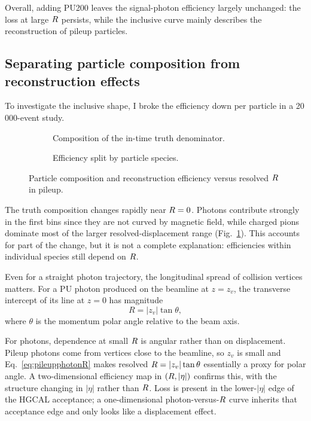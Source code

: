 Overall, adding PU200 leaves the signal-photon efficiency largely unchanged:
the loss at large $R$ persists, while the inclusive curve mainly describes
the reconstruction of pileup particles.

\subsection{Separating particle composition from reconstruction effects}

To investigate the inclusive shape, I broke the efficiency down per particle
in a 20\,000-event study.

\begin{figure}[!tp]
  \centering
  \begin{subfigure}{0.49\textwidth}
    \caption{Composition of the in-time truth denominator.}
  \end{subfigure}\hfill
  \begin{subfigure}{0.49\textwidth}
    \caption{Efficiency split by particle species.}
  \end{subfigure}
  \caption{Particle composition and reconstruction efficiency versus resolved
  $R$ in pileup.}
  \label{fig:pileuppid}
\end{figure}

The truth composition changes rapidly near $R=0$. Photons contribute
strongly in the first bins since they are not curved by magnetic field, while charged pions dominate most of the larger
resolved-displacement range (Fig.~\ref{fig:pileuppid}). This accounts for part
of the change, but it is not a complete explanation: efficiencies
within individual species still depend on $R$.

Even for a straight photon trajectory, the longitudinal spread of collision
vertices matters. For a PU photon produced on the beamline at $z=z_v$, the
transverse intercept of its line at $z=0$ has magnitude
\begin{equation}
 R=|z_v|\tan\theta,
 \label{eq:pileupphotonR}
\end{equation}
where $\theta$ is the momentum polar angle relative to the beam axis.

For photons, dependence at small $R$ is angular rather
than on displacement. Pileup photons come from vertices close to the beamline,
so $z_v$ is small and Eq.~\eqref{eq:pileupphotonR} makes resolved
$R=|z_v|\tan\theta$ essentially a proxy for polar angle. A two-dimensional
efficiency map in $(R,|\eta|)$ confirms this, with the structure changing in
$|\eta|$ rather than $R$. Loss is present in the lower-$|\eta|$ edge of
the HGCAL acceptance; a one-dimensional photon-versus-$R$ curve inherits
that acceptance edge and only looks like a displacement effect.

